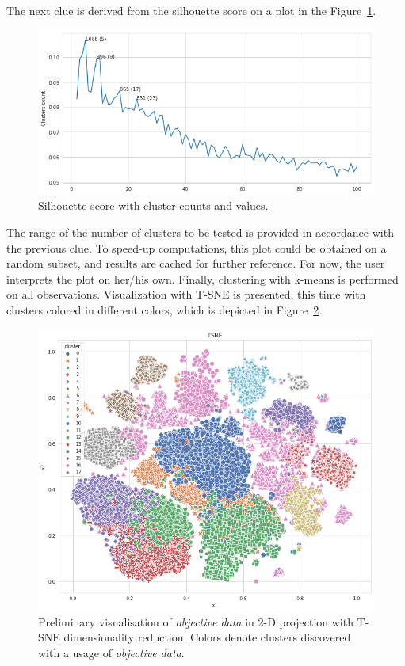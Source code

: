 \documentclass{article}
\begin{document}
The next clue is derived from the silhouette score on a plot in the Figure~\ref{fig:silhouette}.
\begin{figure}[h!]
    \centering
    \includegraphics[width=\linewidth]{silhouette-100}
    \caption{Silhouette score with cluster counts and values.}
    \label{fig:silhouette}
\end{figure}
The range of the number of clusters to be tested is provided in accordance with the previous clue.
To speed-up computations, this plot could be obtained on a random subset, and results are cached for further reference.
For now, the user interprets the plot on her/his own.
Finally, clustering with k-means is performed on all observations.
Visualization with T-SNE is presented, this time with clusters colored in different colors, which is depicted in Figure~\ref{fig:kmeans}.
\begin{figure}[h!]
    \centering
    \includegraphics[width=\linewidth]{example1-clustering-products-fashion-tex/output_59_0}
    \caption{Preliminary visualisation of \textit{objective data} in 2-D projection with T-SNE dimensionality reduction. Colors denote clusters discovered with a usage of \textit{objective data}.}
    \label{fig:kmeans}
\end{figure}
\end{document}
